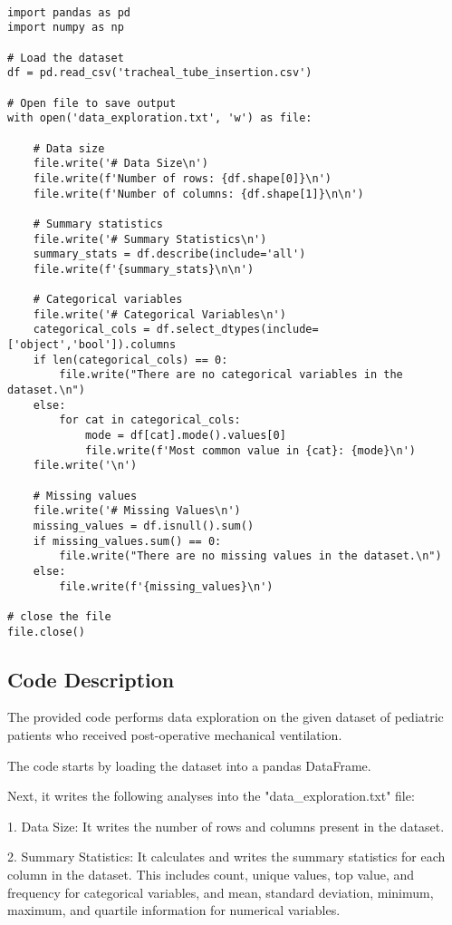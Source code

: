 \documentclass[11pt]{article}
\begin{document}
\begin{verbatim}

import pandas as pd
import numpy as np

# Load the dataset
df = pd.read_csv('tracheal_tube_insertion.csv')

# Open file to save output
with open('data_exploration.txt', 'w') as file:
    
    # Data size
    file.write('# Data Size\n')
    file.write(f'Number of rows: {df.shape[0]}\n')
    file.write(f'Number of columns: {df.shape[1]}\n\n')

    # Summary statistics
    file.write('# Summary Statistics\n')
    summary_stats = df.describe(include='all')
    file.write(f'{summary_stats}\n\n')
    
    # Categorical variables 
    file.write('# Categorical Variables\n')
    categorical_cols = df.select_dtypes(include=['object','bool']).columns
    if len(categorical_cols) == 0:
        file.write("There are no categorical variables in the dataset.\n")
    else:
        for cat in categorical_cols:
            mode = df[cat].mode().values[0]
            file.write(f'Most common value in {cat}: {mode}\n')
    file.write('\n')

    # Missing values
    file.write('# Missing Values\n')
    missing_values = df.isnull().sum()
    if missing_values.sum() == 0:
        file.write("There are no missing values in the dataset.\n")
    else:
        file.write(f'{missing_values}\n')
    
# close the file
file.close()

\end{verbatim}

\subsection{Code Description}

The provided code performs data exploration on the given dataset of pediatric patients who received post-operative mechanical ventilation. 

The code starts by loading the dataset into a pandas DataFrame. 

Next, it writes the following analyses into the "data\_exploration.txt" file:

1. Data Size: It writes the number of rows and columns present in the dataset.

2. Summary Statistics: It calculates and writes the summary statistics for each column in the dataset. This includes count, unique values, top value, and frequency for categorical variables, and mean, standard deviation, minimum, maximum, and quartile information for numerical variables.
\end{document}
